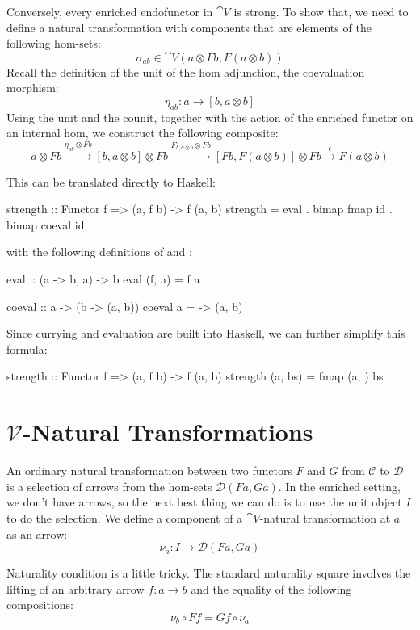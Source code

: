\documentclass[DaoFP]{subfiles}
\begin{document}
Conversely, every enriched endofunctor in $\cat V$ is strong. To show that, we need to define a natural transformation with components that are elements of the following hom-sets:
\[ \sigma_{a b} \in \cat V(a \otimes F b, F (a \otimes b)) \]
Recall the definition of the unit of the hom adjunction, the coevaluation morphism:
\[ \eta_{a b} \colon a \to [b, a \otimes b] \]
Using the unit and the counit, together with the action of the enriched functor on an internal hom, we construct the following composite:
\[ a \otimes F b \xrightarrow{\eta_{a b} \otimes Fb} [b, a \otimes b] \otimes F b \xrightarrow{F_{b, a \otimes b} \otimes F b} [F b, F (a \otimes b)] \otimes F b \xrightarrow{\epsilon} F (a \otimes b)\]

This can be translated directly to Haskell:
\begin{haskell}
strength :: Functor f => (a, f b) -> f (a, b)
strength = eval . bimap fmap id . bimap coeval id
\end{haskell}
with the following definitions of  and :
\begin{haskell}
eval :: (a -> b, a) -> b
eval (f, a) = f a
\end{haskell}
\begin{haskell}
coeval :: a -> (b -> (a, b))
coeval a = \b -> (a, b)
\end{haskell}
Since currying and evaluation are built into Haskell, we can further simplify this formula:
\begin{haskell}
strength :: Functor f => (a, f b) -> f (a, b)
strength (a, bs) = fmap (a, ) bs
\end{haskell}

\section{$\mathcal V$-Natural Transformations}

An ordinary natural transformation between two functors $F$ and $G$ from $\mathcal C$ to $\mathcal D$ is a selection of arrows from the hom-sets $\mathcal D(F a, G a)$. In the enriched setting, we don't have arrows, so the next best thing we can do is to use the unit object $I$ to do the selection. We define a component of a $\cat V$-natural transformation at $a$ as an arrow:
\[ \nu_a \colon I \to \mathcal D(F a, G a) \]

Naturality condition is a little tricky. The standard naturality square involves the lifting of an arbitrary arrow $f \colon a \to b$ and the equality of the following compositions:
\[ \nu_b \circ F f = G f \circ \nu_a \]
\end{document}

